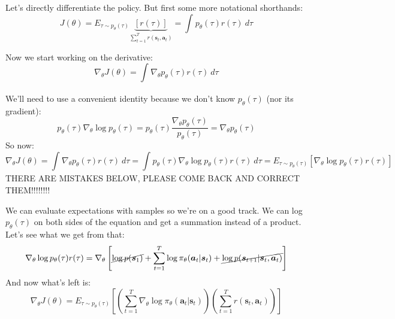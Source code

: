 \documentclass{report}
\begin{document}
Let's directly differentiate the policy.
But first some more notational shorthands:
\begin{equation}
		J(\theta) = E_{\tau \sim p_\theta(\tau)} \underbrace{[r(\tau)]}_{\sum^{T}_{t=1} r(\bm{s}_t, \bm{a}_t)} = 
		\int_{{}}^{} {p_\theta(\tau)r(\tau)} \: d{\tau} {}
\end{equation}

Now we start working on the derivative:
\begin{equation}
		\nabla_\theta J(\theta) = \int_{{}}^{{}} {\nabla_\theta p_\theta (\tau) r(\tau)} \: d{\tau} {}
\end{equation}

We'll need to use a convenient identity because we don't know $p_\theta(\tau)$ (nor its gradient):
\begin{equation}
	p_\theta(\tau) \nabla_\theta \log p_\theta(\tau) =
	p_\theta (\tau) \frac{\nabla_\theta p_\theta(\tau)}{p_\theta(\tau)} =
	\nabla_\theta p_\theta(\tau)
\end{equation}
So now:
\begin{equation}
		\nabla_\theta J(\theta) = \int_{{}}^{{}} {\nabla_\theta p_\theta (\tau) r(\tau)} \: d{\tau} {}
		=
		\int_{{}}^{{}} {p_\theta(\tau) \nabla_\theta \log  p_\theta(\tau) r(\tau) } \: d{\tau} =
		E_{\tau \sim p_\theta(\tau)} [\nabla_\theta \log p_\theta(\tau)r(\tau)]
\end{equation}
THERE ARE MISTAKES BELOW, PLEASE COME BACK AND CORRECT THEM!!!!!!!!

We can evaluate expectations with samples so we're on a good track.
We can log $p_\theta(\tau)$ on both sides of the equation and get a summation instead of a product.
Let's see what we get from that:
\begin{equation}
		\nabla_\theta \log p_\theta(\tau)r(\tau) =
\nabla_\theta \left [\cancel{\log p(\bm{s}_1)} + \sum^{T}_{t=1} \log \pi_\theta (\bm{a}_t | \bm{s}_t) + \cancel{\log p(\bm{s}_{t+1} | \bm{s}_t, \bm{a}_t)} \right ]
\end{equation}
And now what's left is:
\begin{equation}
		\nabla_\theta J(\theta) = E_{\tau \sim p_\theta(\tau)} 
		\left [ \left ( \sum_{t=1}^{T} \nabla_\theta \log \pi_\theta (\bm{a}_t | \bm{s}_t ) \right )
		\left ( \sum_{t=1}^{T} r(\bm{s}_t, \bm{a}_t) \right ) \right ]
\end{equation}
\end{document}
